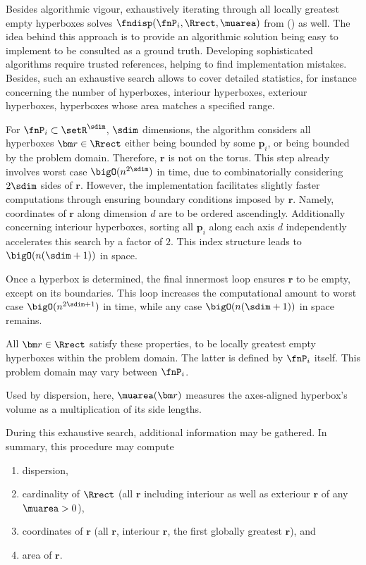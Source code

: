 %
Besides algorithmic vigour, exhaustively iterating through all locally greatest empty hyperboxes solves $\fndisp(\fnP_i, \Rrect, \muarea)$ from () as well. The idea behind this approach is to provide an algorithmic solution being easy to implement to be consulted as a ground truth. Developing sophisticated algorithms require trusted references, helping to find implementation mistakes. Besides, such an exhaustive search allows to cover detailed statistics, for instance concerning the number of hyperboxes, interiour hyperboxes, exteriour hyperboxes, hyperboxes whose area matches a specified range.

For $\fnP_i \subset \setR^{\sdim}$, $\sdim$ dimensions, the algorithm considers all hyperboxes $\bm r \in \Rrect$ either being bounded by some $\bm p_i$, or being bounded by the problem domain. Therefore, $\bm r$ is not on the torus. This step already involves worst case $\bigO(n^{2\sdim})$ in time, due to combinatorially considering $2\sdim$ sides of $\bm r$. However, the implementation facilitates slightly faster computations through ensuring boundary conditions imposed by $\bm r$. Namely, coordinates of $\bm r$ along dimension $d$ are to be ordered ascendingly. Additionally concerning interiour hyperboxes, sorting all $\bm p_i$ along each axis $d$ independently accelerates this search by a factor of $2$. This index structure leads to $\bigO(n (\sdim+1))$ in space.

Once a hyperbox is determined, the final innermost loop ensures $\bm r$ to be empty, except on its boundaries. This loop increases the computational amount to worst case $\bigO(n^{2\sdim + 1})$ in time, while any case $\bigO(n (\sdim+1))$ in space remains.

All $\bm r \in \Rrect$ satisfy these properties, to be locally greatest empty hyperboxes within the problem domain. The latter is defined by $\fnP_i$ itself. This problem domain may vary between $\fnP_i$.

Used by dispersion, here, $\muarea(\bm r)$ measures the axes-aligned hyperbox's volume as a multiplication of its side lengths.

During this exhaustive search, additional information may be gathered. In summary, this procedure may compute
\begin{enumerate}
  \item dispersion,
  \item cardinality of $\Rrect$ (all $\bm r$ including interiour as well as exteriour $\bm r$ of any $\muarea > 0$),
  \item coordinates of $\bm r$ (all $\bm r$, interiour $\bm r$, the first globally greatest $\bm r$), and
  \item area of $\bm r$.
\end{enumerate}

